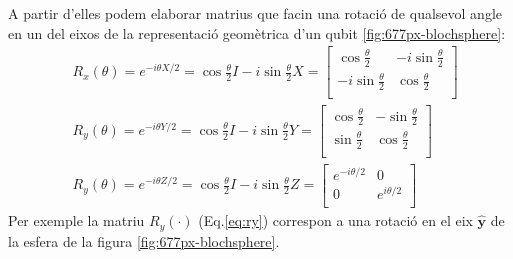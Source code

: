 A partir d'elles podem elaborar matrius que facin una rotació de qualsevol angle  en un del eixos de la representació geomètrica d'un qubit \ref{fig:677px-blochsphere}: 
\begin{align}
	& R_x(\theta) =  e^{-i\theta X/2} = \cos \frac{\theta}{2}I -i \sin \frac{\theta}{2}X = 
	\begin{bmatrix}
		\cos \frac{\theta}{2} & -i \sin \frac{\theta}{2} \\
		-i\sin \frac{\theta}{2} & \cos\frac{\theta}{2} \\
	\end{bmatrix} \label{eq:rx}\\
	& R_y(\theta) =  e^{-i\theta Y/2} = \cos \frac{\theta}{2}I -i \sin \frac{\theta}{2}Y = 
	\begin{bmatrix}
		\cos \frac{\theta}{2} & -\sin \frac{\theta}{2} \\
		\sin \frac{\theta}{2} & \cos\frac{\theta}{2} \\
	\end{bmatrix} \label{eq:ry}\\
	& R_y(\theta) =  e^{-i\theta Z/2} = \cos \frac{\theta}{2}I -i \sin \frac{\theta}{2}Z = 
	\begin{bmatrix}
		e^{-i\theta/2} & 0 \\
		0 & e^{i\theta/2} \\
	\end{bmatrix} \label{eq:rz}
\end{align}
Per exemple la matriu $R_y(\cdot)$ (Eq.\ref{eq:ry}) correspon a una rotació en el eix $\hat{\mathbf{y}}$ de la esfera de la figura \ref{fig:677px-blochsphere}. 

